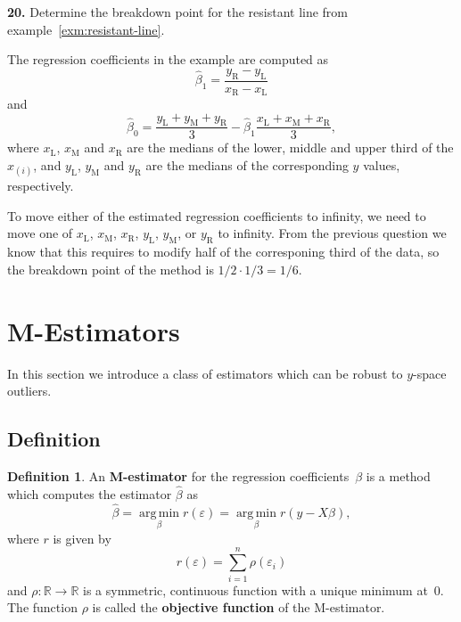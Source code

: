 \documentclass[
  a4paper,
]{article}
\theoremstyle{definition}
\newtheorem{definition}{Definition}[section]
\theoremstyle{definition}
\theoremstyle{definition}
\theoremstyle{definition}
\theoremstyle{remark}
\begin{document}
\textbf{20.}
Determine the breakdown point for the resistant line from
example~\ref{exm:resistant-line}.

\begin{myanswers}
The regression coefficients in the example are computed
as
\begin{equation*}
  \hat\beta_1
  = \frac{y_\mathrm{R} - y_\mathrm{L}}{x_\mathrm{R} - x_\mathrm{L}}
\end{equation*}
and
\begin{equation*}
  \hat\beta_0
  = \frac{y_\mathrm{L} + y_\mathrm{M} + y_\mathrm{R}}{3}
      - \hat\beta_1 \frac{x_\mathrm{L} + x_\mathrm{M} + x_\mathrm{R}}{3},
\end{equation*}
where
\(x_\mathrm{L}\), \(x_\mathrm{M}\) and \(x_\mathrm{R}\)
are the medians of the lower, middle and upper third of the \(x_{(i)}\),
and \(y_\mathrm{L}\), \(y_\mathrm{M}\) and \(y_\mathrm{R}\) are the medians
of the corresponding \(y\) values, respectively.

To move either of the estimated regression coefficients to infinity,
we need to move one of \(x_\mathrm{L}\), \(x_\mathrm{M}\), \(x_\mathrm{R}\),
\(y_\mathrm{L}\), \(y_\mathrm{M}\), or \(y_\mathrm{R}\) to infinity.
From the previous question we know that this requires to modify
half of the corresponing third of the data, so the breakdown point
of the method is \(1/2 \cdot 1/3 = 1/6\).

\end{myanswers}

\clearpage

\hypertarget{S18-m-est}{%
\section{M-Estimators}\label{S18-m-est}}

In this section we introduce a class of estimators which can be robust to
\(y\)-space outliers.

\hypertarget{definition}{%
\subsection{Definition}\label{definition}}

\begin{definition}
An \textbf{M-estimator} for the regression coefficients~\(\beta\) is a method
which computes the estimator \(\hat\beta\) as
\begin{equation*}
  \hat\beta
  = \mathop{\mathrm{arg\,min}}\limits_\beta r(\varepsilon)
  = \mathop{\mathrm{arg\,min}}\limits_\beta r(y - X\beta),
\end{equation*}
where \(r\) is given by
\begin{equation*}
  r(\varepsilon)
  = \sum_{i=1}^n \rho(\varepsilon_i)
\end{equation*}
and \(\rho\colon \mathbb{R}\to \mathbb{R}\) is a symmetric, continuous function with
a unique minimum at~\(0\). The function \(\rho\) is called the
\textbf{objective function} of the M-estimator.
\end{definition}
\end{document}

